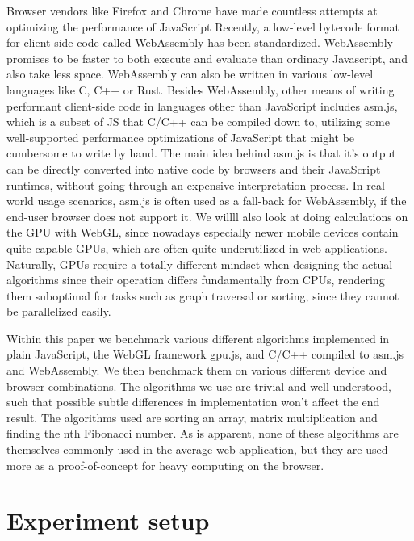 \documentclass[conference]{IEEEtran}
\begin{document}
Browser vendors like Firefox and Chrome have made countless attempts at
optimizing the performance of JavaScript Recently, a low-level bytecode format
for client-side code called WebAssembly has been standardized. WebAssembly
promises to be faster to both execute and evaluate than ordinary Javascript,
and also take less space. WebAssembly can also be written in various low-level
languages like C, C++ or Rust. Besides WebAssembly, other means of writing
performant client-side code in languages other than JavaScript includes asm.js,
which is a subset of JS that C/C++ can be compiled down to, utilizing some
well-supported performance optimizations of JavaScript that might be cumbersome
to write by hand. The main idea behind asm.js is that it’s output can be
directly converted into native code by browsers and their JavaScript runtimes,
without going through an expensive interpretation process. In real-world usage
scenarios, asm.js is often used as a fall-back for WebAssembly, if the end-user
browser does not support it. We willll also look at doing calculations on the
GPU with WebGL, since nowadays especially newer mobile devices contain quite
capable GPUs, which are often quite underutilized in web applications.
Naturally, GPUs require a totally different mindset when designing the actual
algorithms since their operation differs fundamentally from CPUs, rendering
them suboptimal for tasks such as graph traversal or sorting, since they cannot
be parallelized easily.

Within this paper we benchmark various different algorithms implemented in
plain JavaScript, the WebGL framework gpu.js, and C/C++ compiled to asm.js and
WebAssembly.  We then benchmark them on various different device and browser
combinations. The algorithms we use are  trivial and well understood, such that
possible subtle differences in implementation won't affect the end result. The
algorithms used are sorting an array, matrix multiplication and finding the nth
Fibonacci number. As is apparent, none of these algorithms are themselves
commonly used in the average web application, but they are used more as a
proof-of-concept for heavy computing on the browser.

\section{Experiment setup}
\end{document}
